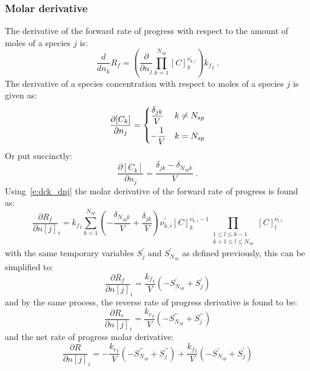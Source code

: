 \documentclass[12pt]{article}
\newcommand{\ns}{\ensuremath{{N_{sp}}}}
\begin{document}
\subsubsection{Molar derivative}
\label{s:rop_molar}
The derivative of the forward rate of progress with respect to the amount of moles of a species $j$ is:
\begin{equation}
 \frac{d}{d n_{k}} {R_f} = \left(\frac{\partial}{\partial n_{j}} \prod_{k=1}^{\ns} [C]_{k}^{\nu^{\prime}_{k,i}}\right) {k_f}_{i} \;.
\end{equation}
The derivative of a species concentration with respect to moles of a species $j$ is given as:
\begin{equation}
 \frac{\partial [C_k]}{\partial n_j} =
 \begin{dcases}
 \frac{\delta_{j k}}{V} & k \ne \ns \\
 -\frac{1}{V} & k = \ns
 \end{dcases}
\end{equation}
Or put succinctly:
\begin{equation}
\label{e:dck_dnj}
\frac{\partial [C_k]}{\partial n_j} = \frac{\delta_{j k} - \delta_{\ns k}}{V} \;.
\end{equation}
Using~\cref{e:dck_dnj} the molar derivative of the forward rate of progress is found as:
\begin{equation}
 \frac{\partial {R_f} }{\partial n[j] }_{i} = {k_f}_{i} \sum_{k=1}^{\ns} \left(- \frac{\delta_{\ns k}}{V} + \frac{\delta_{j k}}{V}\right) \nu^{\prime}_{k,i} [C]_{k}^{\nu^{\prime}_{k,i} - 1} \prod_{\substack{1 \leq l \leq k - 1\\k + 1 \leq l \leq \ns}} [C]_{l}^{\nu^{\prime}_{l,i}}
\end{equation}
with the same temporary variables $S^{\prime}_{j}$ and $S^{\prime}_{\ns}$ as defined previously, this can be simplified to:
\begin{equation}
 \label{e:dropf_dnj}
 \frac{\partial {R_f} }{\partial n[j] }_{i} = \frac{{k_f}_{i}}{V} \left(- S^{\prime}_{\ns} + S^{\prime}_{j}\right)
\end{equation}
and by the same process, the reverse rate of progress derivative is found to be:
\begin{equation}
 \label{e:dropr_dnj}
 \frac{\partial {R_r} }{\partial n[j] }_{i} = \frac{{k_r}_{i}}{V} \left(- S^{\prime\prime}_{\ns} + S^{\prime\prime}_{j}\right)
\end{equation}
and the net rate of progress molar derivative:
\begin{equation}
 \frac{\partial R }{\partial n[j] }_{i} = - \frac{{k_r}_{i}}{V} \left(- S^{\prime\prime}_{\ns} + S^{\prime\prime}_{j}\right) + \frac{{k_f}_{i}}{V} \left(- S^{\prime}_{\ns} + S^{\prime}_{j}\right)
\end{equation}
\end{document}
